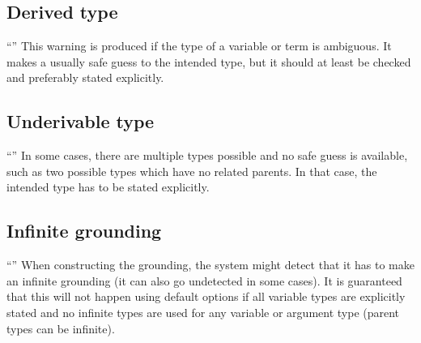 \subsection{Derived type}
``''
This warning is produced if the type of a variable or term is ambiguous.
It makes a usually safe guess to the intended type, but it should at least be checked and preferably stated explicitly.

\subsection{Underivable type}
``''
In some cases, there are multiple types possible and no safe guess is available, such as two possible types which have no related parents.
In that case, the intended type has to be stated explicitly. 

\subsection{Infinite grounding}
``''
When constructing the grounding, the system might detect that it has to make an infinite grounding (it can also go undetected in some cases).
It is guaranteed that this will not happen using default options if all variable types are explicitly stated and no infinite types are used for any variable or argument type (parent types can be infinite).